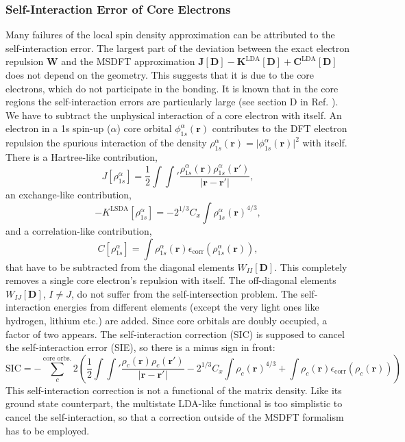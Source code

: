 \documentclass[journal=jpclcd,manuscript=letter]{achemso}
\newcommand\m[1]{\mathbf{#1}}
\renewcommand\vec[1]{\mathbf{#1}}
\begin{document}
\subsubsection{Self-Interaction Error of Core Electrons}
Many failures of the local spin density approximation can be attributed to the self-interaction error. \cite{Perdew1981}
The largest part of the deviation between the exact electron repulsion $\m{W}$ and
the MSDFT approximation $\m{J}[\m{D}]-\m{K}^{\text{LDA}}[\m{D}] + \m{C}^{\text{LDA}}[\m{D}]$ does not depend on the geometry.
This suggests that it is due to the core electrons, which do not participate in the bonding.
It is known that in the core regions the self-interaction errors are particularly large (see section D in Ref. \cite{Tsuneda2014}).
We have to subtract the unphysical interaction of a core electron with itself. An electron in a 1s spin-up ($\alpha$) core orbital $\phi^{\alpha}_{1s}(\vec{r})$
contributes to the DFT electron repulsion the spurious interaction of the density $\rho^{\alpha}_{1s}(\vec{r}) = \vert \phi^{\alpha}_{1s}(\vec{r})\vert^2$
with itself. There is a Hartree-like contribution,
\begin{equation}
J[\rho^{\alpha}_{1s}] = \frac{1}{2} \int \int' \frac{\rho^{\alpha}_{1s}(\vec{r}) \rho^{\alpha}_{1s}(\vec{r}')}{\vert \vec{r} - \vec{r}' \vert},
\end{equation}
an exchange-like contribution,
\begin{equation}
-K^{\text{LSDA}}[\rho^{\alpha}_{1s}] = - 2^{1/3} C_x \int \rho^{\alpha}_{1s}(\vec{r})^{4/3},
\end{equation}
and a correlation-like contribution,
\begin{equation}
C[\rho^{\alpha}_{1s}] = \int \rho^{\alpha}_{1s}(\vec{r}) \epsilon_{\text{corr}}(\rho^{\alpha}_{1s}(\vec{r})),
\end{equation}
that have to be subtracted from the diagonal elements $W_{II}[\m{D}]$.
This completely removes a single core electron's repulsion with itself.
The off-diagonal elements $W_{IJ}[\m{D}]$, $I \neq J$, do not suffer from the self-intersection problem.
The self-interaction energies from different elements (except the very light ones like hydrogen, lithium etc.) are added.
Since core orbitals are doubly occupied, a factor of two appears.
The self-interaction correction (SIC) is supposed to cancel the self-interaction error (SIE), so there is a minus sign in front:
\begin{equation}
\text{SIC} = - \sum_{c}^{\text{core orbs.}} 2 \left(
  \frac{1}{2} \int \int' \frac{\rho_{c}(\vec{r}) \rho_{c}(\vec{r}')}{\vert \vec{r} - \vec{r}' \vert}
  - 2^{1/3} C_x \int \rho_c(\vec{r})^{4/3}
  + \int \rho_c(\vec{r}) \epsilon_{\text{corr}}(\rho_c(\vec{r}))
 \right)
\end{equation}
This self-interaction correction is not a functional of the matrix density. Like its ground state counterpart,
the multistate 
LDA-like
functional is too simplistic to cancel the self-interaction, so that a correction
outside of the MSDFT formalism has to be employed.
\end{document}
